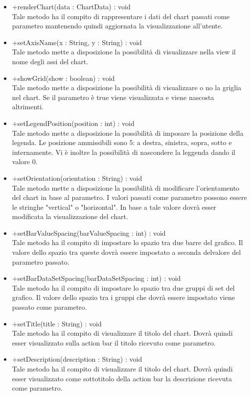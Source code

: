 \begin{itemize}
\begin{itemize}
					\item[\ding{111}] {{+renderChart(data : ChartData) : void}} \\ [1mm] Tale metodo ha il compito di rappresentare i dati del chart passati come parametro mantenendo quindi aggiornata la visualizzazione all'utente.
					\item[\ding{111}] {{+setAxisName(x : String, y : String) : void}} \\ [1mm] Tale metodo mette a disposizione la possibilità di visualizzare nella view il nome degli assi del chart.
					\item[\ding{111}] {{+showGrid(show : boolean) : void}} \\ [1mm] Tale metodo mette a disposizione la possibilità di visualizzare o no la griglia nel chart. Se il parametro è true viene visualizzata e viene nascosta altrimenti.
					\item[\ding{111}] {{+setLegendPosition(position : int) : void}} \\ [1mm] Tale metodo mette a disposizione la possibilità di imposare la posizione della legenda. Le posizione ammissibili sono 5: a destra, sinistra, sopra, sotto e internamente. Vi è inoltre la possibilità di nascondere la leggenda dando il valore 0.
					\item[\ding{111}] {{+setOrientation(orientation : String) : void}} \\ [1mm] Tale metodo mette a disposizione la possibilità di modificare l'orientamento del chart in base al parametro. I valori passati come parametro possono essere le stringhe "vertical" o "horizontal". In base a tale valore dovrà esser modificata la visualizzazione del chart.
					\item[\ding{111}] {{+setBarValueSpacing(barValueSpacing : int) : void}} \\ [1mm] Tale metodo ha il compito di impostare lo spazio tra due barre del grafico. Il valore dello spazio tra queste dovrà essere impostato a seconda delvalore del parametro passato.
					\item[\ding{111}] {{+setBarDataSetSpacing(barDataSetSpacing : int) : void}} \\ [1mm] Tale metodo ha il compito di impostare lo spazio tra due gruppi di set del grafico. Il valore dello spazio tra i gruppi che dovrà essere impostato viene passato come parametro.
					\item[\ding{111}] {{+setTitle(title : String) : void}} \\ [1mm] Tale metodo ha il compito di visualizzare il titolo del chart. Dovrà quindi esser visualizzato sulla action bar il titolo ricevuto come parametro.
					\item[\ding{111}] {{+setDescription(description : String) : void}} \\ [1mm] Tale metodo ha il compito di visualizzare il titolo del chart. Dovrà quindi esser visualizzato come sottotitolo della action bar la descrizione ricevuta come parametro.
				\end{itemize}
		
			\end{itemize}

